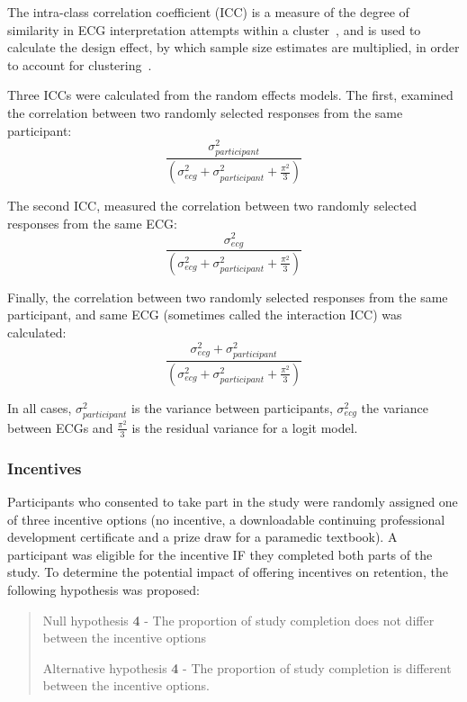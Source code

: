 The intra-class correlation coefficient (ICC) is a measure of the degree of similarity in ECG interpretation attempts within a cluster~\citep{eldridge_intra-cluster_2009}, and is used to calculate the design effect, by which sample size estimates are multiplied, in order to account for clustering~\citep{yelland_adjusted_2011}.

Three ICCs were calculated from the random effects models. The first, examined the correlation between two randomly selected responses from the same participant:
\[ \frac{\sigma^2_{participant}}{\left(\sigma^2_{ecg}+\sigma^2_{participant}+\frac{\pi^2}{3}\right)} \]

The second ICC, measured the correlation between two randomly selected responses from the same ECG:
\[ \frac{\sigma^2_{ecg}}{\left(\sigma^2_{ecg}+\sigma^2_{participant}+\frac{\pi^2}{3}\right)} \]

Finally, the correlation between two randomly selected responses from the same participant, and same ECG (sometimes called the interaction ICC) was calculated:
\[ \frac{\sigma^2_{ecg}+\sigma^2_{participant}}{\left(\sigma^2_{ecg}+\sigma^2_{participant}+\frac{\pi^2}{3}\right)} \]

In all cases, $  \sigma^2_{participant} $ is the variance between participants, $  \sigma^2_{ecg} $ the variance between ECGs and $  \frac{\pi^2}{3} $ is the residual variance for a logit model. 

\subsubsection{Incentives}
\label{incentives}

Participants who consented to take part in the study were randomly assigned one of three incentive options (no incentive, a downloadable continuing professional development certificate and a prize draw for a paramedic textbook). A participant was eligible for the incentive IF they completed both parts of the study. To determine the potential impact of offering incentives on retention, the following hypothesis was proposed:

\begin{quote}

Null hypothesis \textbf{4} - The proportion of study completion does not differ between the incentive options

Alternative hypothesis \textbf{4} - The proportion of study completion is different between the incentive options.
\end{quote}

